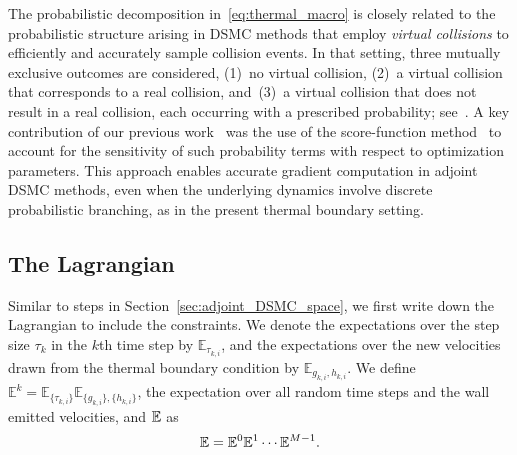 \documentclass[12pt,nopreprintline]{elsarticle}
\begin{document}
The probabilistic decomposition in~\eqref{eq:thermal_macro} is closely related to the probabilistic structure arising in DSMC methods that employ \emph{virtual collisions} to efficiently and accurately sample collision events. In that setting, three mutually exclusive outcomes are considered, (1)~no virtual collision, (2)~a virtual collision that corresponds to a real collision, and~(3)~a virtual collision that does not result in a real collision, each occurring with a prescribed probability; see~\cite[Eqns.~(11)-(13)]{yang2023adjoint}. A key contribution of our previous work~\cite{yang2023adjoint} was the use of the score-function method~\cite{rubinstein1986score} to account for the sensitivity of such probability terms with respect to optimization parameters. This approach enables accurate gradient computation in adjoint DSMC methods, even when the underlying dynamics involve discrete probabilistic branching, as in the present thermal boundary setting.



\subsection{The Lagrangian}
Similar to steps in Section~\ref{sec:adjoint_DSMC_space}, we first write down the Lagrangian to include the constraints. We denote the expectations over the step size $\tau_k$ in the $k$th time step by $\mathbb{E}_{\tau_{k,i}}$,  and the expectations over the new velocities drawn from the thermal boundary condition by $\mathbb{E}_{g_{k,i},h_{k,i}} $. We define $\mathbb{E}^k = \mathbb{E}_{\{\tau_{k,i}\}} \mathbb{E}_{\{g_{k,i}\},\{h_{k,i}\}}$, the expectation over all random time steps and the wall emitted velocities, and $\mathbb E$ as $$\mathbb E = \mathbb E^0 \mathbb E^1 \cdots \mathbb E^{M-1}.$$
\end{document}
